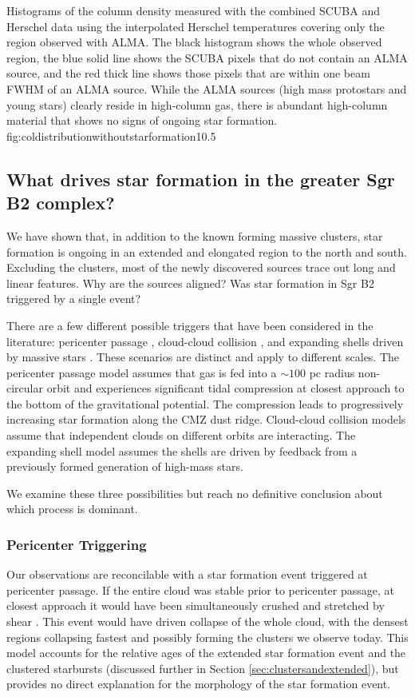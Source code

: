 \documentclass[twocolumn]{aastex61}
\begin{document}
{Histograms of the column density measured with the combined SCUBA and Herschel
data using the interpolated Herschel temperatures covering only the region
observed with ALMA.  The black histogram shows the whole observed region,
the blue solid line shows the SCUBA pixels that do not contain an ALMA source,
and the red thick line shows those pixels that are within one beam
FWHM of an ALMA source.  While the ALMA sources (high mass protostars and young
stars)
clearly reside in high-column gas, there is abundant high-column material
that shows no signs of ongoing star formation.}
{fig:coldistributionwithoutstarformation}{1}{0.5\textwidth}

\subsection{What drives star formation in the greater Sgr B2 complex?}
\label{sec:whatdrives}
We have shown that, in addition to the known forming massive clusters,
star formation is ongoing in an extended and elongated region to the north
and south.  Excluding the clusters, most of the newly discovered sources
trace out long and linear features.  Why are the sources aligned?
Was star formation in Sgr B2 triggered by a single event?

There are a few different possible triggers that have been considered in the
literature: pericenter passage \citep{Kruijssen2015a}, cloud-cloud collision
\citep{Hasegawa1994a,Mehringer1997a,Sato2000a}, and expanding shells driven by
massive stars \citep{Martin-Pintado1999a}.  These scenarios are distinct and
apply to different scales.  The pericenter passage model assumes that gas is
fed into a $\sim100$ pc radius non-circular orbit and experiences significant
tidal compression at closest approach to the bottom of the gravitational
potential.  The compression leads to progressively increasing star formation
along the CMZ dust ridge.  Cloud-cloud collision models assume that independent
clouds on different orbits are interacting.  The expanding shell model assumes
the shells are driven by feedback from a previously formed generation of
high-mass stars.

We examine these three possibilities but reach no definitive conclusion about
which process is dominant.

\subsubsection{Pericenter Triggering}
Our observations are reconcilable with a star formation event triggered
at pericenter passage.  If the entire cloud was stable prior to pericenter
passage, at closest approach it would have been simultaneously crushed and
stretched by shear \citep{Kruijssen2015a}.  This event would have driven
collapse of the whole cloud, with the densest regions collapsing fastest and
possibly forming the clusters we observe today.  This model accounts for the
relative ages of the extended star formation event and the clustered starbursts
(discussed further in Section \ref{sec:clustersandextended}), but provides no
direct explanation for the morphology of the star formation event.
\end{document}
